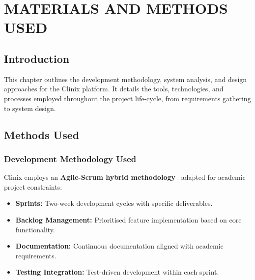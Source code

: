 ﻿%
\chapter{MATERIALS AND METHODS USED}

\section{Introduction}

This chapter outlines the development methodology, system analysis, and design approaches for the Clinix platform. It details the tools, technologies, and processes employed throughout the project life-cycle, from requirements gathering to system design.

\section{Methods Used}

\subsection{Development Methodology Used}

Clinix employs an \textbf{Agile-Scrum hybrid methodology}~\cite{schwaber2020scrum} adapted for academic project constraints:

\begin{itemize}
  \item \textbf{Sprints:} Two-week development cycles with specific deliverables.
  \item \textbf{Backlog Management:} Prioritised feature implementation based on core functionality.
  \item \textbf{Documentation:} Continuous documentation aligned with academic requirements.
  \item \textbf{Testing Integration:} Test-driven development within each sprint.
\end{itemize}

